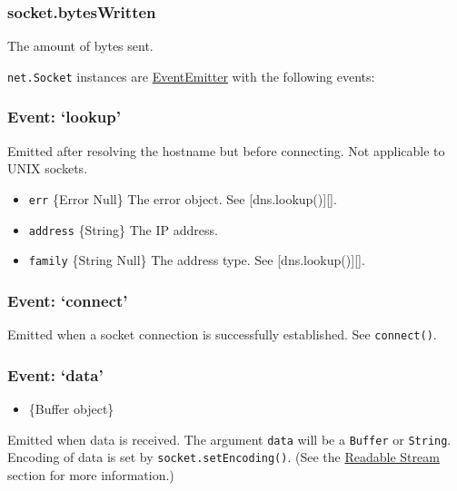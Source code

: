 \subsubsection{socket.bytesWritten}\label{socket.byteswritten}

The amount of bytes sent.

\texttt{net.Socket} instances are
\href{events.html\#events_class_events_eventemitter}{EventEmitter} with
the following events:

\subsubsection{Event: `lookup'}\label{event-lookup}

Emitted after resolving the hostname but before connecting. Not
applicable to UNIX sockets.

\begin{itemize}
\itemsep1pt\parskip0pt
\item
  \texttt{err} \{Error \textbar{} Null\} The error object. See
  {[}dns.lookup(){]}{[}{]}.
\item
  \texttt{address} \{String\} The IP address.
\item
  \texttt{family} \{String \textbar{} Null\} The address type. See
  {[}dns.lookup(){]}{[}{]}.
\end{itemize}

\subsubsection{Event: `connect'}\label{event-connect}

Emitted when a socket connection is successfully established. See
\texttt{connect()}.

\subsubsection{Event: `data'}\label{event-data}

\begin{itemize}
\itemsep1pt\parskip0pt
\item
  \{Buffer object\}
\end{itemize}

Emitted when data is received. The argument \texttt{data} will be a
\texttt{Buffer} or \texttt{String}. Encoding of data is set by
\texttt{socket.setEncoding()}. (See the
\href{stream.html\#stream_readable_stream}{Readable Stream} section for
more information.)

